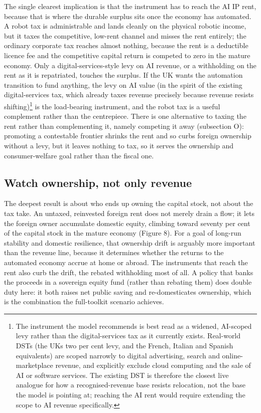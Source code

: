 \documentclass[11pt]{article}
\begin{document}
The single clearest implication is that the instrument has to reach the
AI IP rent, because that is where the durable surplus sits once the
economy has automated. A robot tax is administrable and lands cleanly on
the physical robotic income, but it taxes the competitive, low-rent
channel and misses the rent entirely; the ordinary corporate tax reaches
almost nothing, because the rent is a deductible licence fee and the
competitive capital return is competed to zero in the mature economy.
Only a digital-services-style levy on AI revenue, or a withholding on
the rent as it is repatriated, touches the surplus. If the UK wants the
automation transition to fund anything, the levy on AI value (in the
spirit of the existing digital-services tax, which already taxes revenue
precisely because revenue resists shifting)\footnote{The instrument the
model recommends is best read as a widened, AI-scoped levy rather than
the digital-services tax as it currently exists. Real-world DSTs (the
UK\textquotesingle s two per cent levy, and the French, Italian and
Spanish equivalents) are scoped narrowly to digital advertising, search
and online-marketplace revenue, and explicitly exclude cloud computing
and the sale of AI or software services. The existing DST is therefore
the closest live analogue for how a recognised-revenue base resists
relocation, not the base the model is pointing at; reaching the AI rent
would require extending the scope to AI revenue specifically.} is the
load-bearing instrument, and the robot tax is a useful complement rather than the
centrepiece. There is one alternative to taxing the rent rather than
complementing it, namely competing it away (subsection O): promoting a
contestable frontier shrinks the rent and so curbs foreign ownership
without a levy, but it leaves nothing to tax, so it serves the ownership
and consumer-welfare goal rather than the fiscal one.

\hypertarget{watch-ownership-not-only-revenue}{%
\subsection{Watch ownership, not only
revenue}\label{watch-ownership-not-only-revenue}}

The deepest result is about who ends up owning the capital stock, not
about the tax take. An untaxed, reinvested foreign rent does not merely
drain a flow; it lets the foreign owner accumulate domestic equity,
climbing toward seventy per cent of the capital stock in the mature
economy (Figure 8). For a goal of long-run stability and domestic
resilience, that ownership drift is arguably more important than the
revenue line, because it determines whether the returns to the automated
economy accrue at home or abroad. The instruments that reach the rent
also curb the drift, the rebated withholding most of all. A policy that
banks the proceeds in a sovereign equity fund (rather than rebating
them) does double duty here: it both raises net public saving and
re-domesticates ownership, which is the combination the full-toolkit
scenario achieves.
\end{document}
